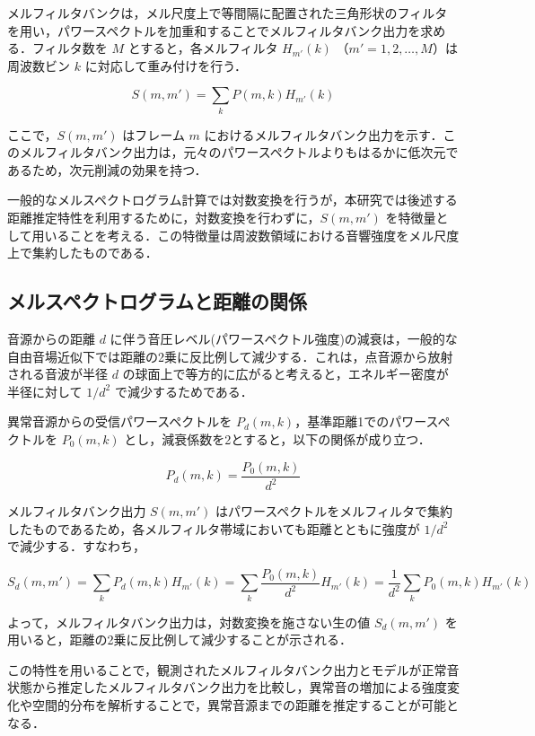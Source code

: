 \documentclass[../main]{subfiles}
\begin{document}
メルフィルタバンクは，メル尺度上で等間隔に配置された三角形状のフィルタを用い，パワースペクトルを加重和することでメルフィルタバンク出力を求める．フィルタ数を $M$ とすると，各メルフィルタ $H_{m'}(k)$ （$m' = 1, 2, \dots, M$）は周波数ビン $k$ に対応して重み付けを行う．

\[
S(m, m') = \sum_{k} P(m, k) H_{m'}(k)
\]

ここで，$S(m, m')$ はフレーム $m$ におけるメルフィルタバンク出力を示す．このメルフィルタバンク出力は，元々のパワースペクトルよりもはるかに低次元であるため，次元削減の効果を持つ．

一般的なメルスペクトログラム計算では対数変換を行うが，本研究では後述する距離推定特性を利用するために，対数変換を行わずに，$S(m, m')$ を特徴量として用いることを考える．この特徴量は周波数領域における音響強度をメル尺度上で集約したものである．



\subsection{メルスペクトログラムと距離の関係}

音源からの距離 $d$ に伴う音圧レベル(パワースペクトル強度)の減衰は，一般的な自由音場近似下では距離の2乗に反比例して減少する．これは，点音源から放射される音波が半径 $d$ の球面上で等方的に広がると考えると，エネルギー密度が半径に対して $1/d^2$ で減少するためである．

異常音源からの受信パワースペクトルを $P_d(m, k)$，基準距離1でのパワースペクトルを $P_0(m, k)$ とし，減衰係数を2とすると，以下の関係が成り立つ．

\[
P_d(m, k) = \frac{P_0(m, k)}{d^2}
\]

メルフィルタバンク出力 $S(m, m')$ はパワースペクトルをメルフィルタで集約したものであるため，各メルフィルタ帯域においても距離とともに強度が $1/d^2$ で減少する．すなわち，

\[
S_d(m, m') = \sum_{k} P_d(m, k) H_{m'}(k) = \sum_{k} \frac{P_0(m, k)}{d^2} H_{m'}(k) = \frac{1}{d^2} \sum_{k} P_0(m, k) H_{m'}(k)
\]

よって，メルフィルタバンク出力は，対数変換を施さない生の値 $S_d(m, m')$ を用いると，距離の2乗に反比例して減少することが示される．

この特性を用いることで，観測されたメルフィルタバンク出力とモデルが正常音状態から推定したメルフィルタバンク出力を比較し，異常音の増加による強度変化や空間的分布を解析することで，異常音源までの距離を推定することが可能となる．
\end{document}
